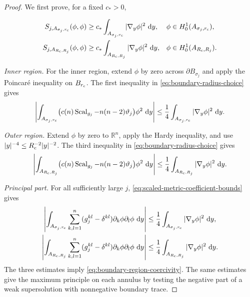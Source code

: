 \documentclass[11pt]{article}
\numberwithin{equation}{section}
\theoremstyle{remark}
\newcommand{\R}{\mathbb R}
\newcommand{\dd}{\mathop{}\!\mathrm{d}}
\begin{document}
\begin{proof}
We first prove, for a fixed \(c_*>0\),
 
\begin{equation}\label{eq:boundary-region-coercivity}
 \begin{aligned}
  S_{j,A_{\sigma_j,r_{\rm c}}}(\phi,\phi)
 &\ge c_*\int_{A_{\sigma_j,r_{\rm c}}}|\nabla_y\phi|^2\,\dd y,
 &&\phi\in H_0^1(A_{\sigma_j,r_{\rm c}}),\\
  S_{j,A_{R_{\rm c},R_j}}(\phi,\phi)
 &\ge c_*\int_{A_{R_{\rm c},R_j}}|\nabla_y\phi|^2\,\dd y,
 &&\phi\in H_0^1(A_{R_{\rm c},R_j}).
 \end{aligned}
\end{equation}

\emph{Inner region.}
For the inner region, extend \(\phi\) by zero across
\(\partial B_{\sigma_j}\) and apply the Poincar\'e inequality on
\(B_{r_{\rm c}}\). The first inequality in
\eqref{eq:boundary-radius-choice} gives
\[
 \left|\int_{A_{\sigma_j,r_{\rm c}}}
 \bigl(c(n)\operatorname{Scal}_{g_j}-n(n-2)\vartheta_j\bigr)\phi^2\,\dd y\right|
 \le\frac14
 \int_{A_{\sigma_j,r_{\rm c}}}|\nabla_y\phi|^2\,\dd y.
\]

\emph{Outer region.}
Extend \(\phi\) by zero to \(\R^n\), apply the Hardy inequality, and use
\(|y|^{-4}\le R_{\rm c}^{-2}|y|^{-2}\). The third inequality in
\eqref{eq:boundary-radius-choice} gives
\[
 \left|\int_{A_{R_{\rm c},R_j}}
 \bigl(c(n)\operatorname{Scal}_{g_j}-n(n-2)\vartheta_j\bigr)\phi^2\,\dd y\right|
 \le\frac14
 \int_{A_{R_{\rm c},R_j}}|\nabla_y\phi|^2\,\dd y.
\]

\emph{Principal part.}
For all sufficiently large \(j\),
\eqref{eq:scaled-metric-coefficient-bounds} gives
\[
 \begin{aligned}
 \left|\int_{A_{\sigma_j,r_{\rm c}}}\sum_{k,l=1}^n
 (g_j^{kl}-\delta^{kl})\partial_k\phi\partial_l\phi\,\dd y\right|
 &\le\frac14\int_{A_{\sigma_j,r_{\rm c}}}|\nabla_y\phi|^2\,\dd y,\\
 \left|\int_{A_{R_{\rm c},R_j}}\sum_{k,l=1}^n
 (g_j^{kl}-\delta^{kl})\partial_k\phi\partial_l\phi\,\dd y\right|
 &\le\frac14\int_{A_{R_{\rm c},R_j}}|\nabla_y\phi|^2\,\dd y.
 \end{aligned}
\]
The three estimates imply \eqref{eq:boundary-region-coercivity}.
The same estimates give the maximum principle on each annulus by testing
the negative part of a weak supersolution with nonnegative boundary trace.


\end{proof}
\end{document}
